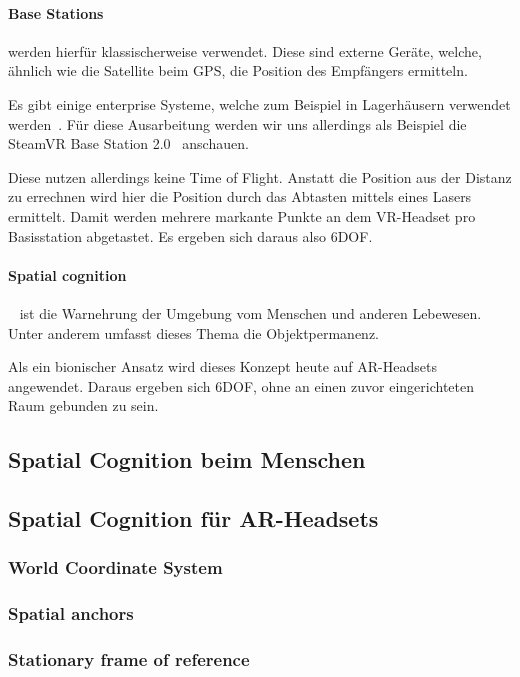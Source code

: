 \paragraph{Base Stations}\label{par:base-stations} werden hierfür klassischerweise verwendet.
Diese sind externe Geräte, welche, ähnlich wie die Satellite beim GPS, die Position des Empfängers ermitteln.

Es gibt einige enterprise Systeme, welche zum Beispiel in Lagerhäusern verwendet werden~\autocite{wikipedia-contributors-2023E}.
Für diese Ausarbeitung werden wir uns allerdings als Beispiel die SteamVR Base Station 2.0~\autocite{valve-corporation-no-date} anschauen.

Diese nutzen allerdings keine Time of Flight.
Anstatt die Position aus der Distanz zu errechnen wird hier die Position durch das Abtasten mittels eines Lasers ermittelt.
Damit werden mehrere markante Punkte an dem VR-Headset pro Basisstation abgetastet.
Es ergeben sich daraus also 6DOF\@.

\paragraph{Spatial cognition}~\autocite{wikipedia-contributors-2023F} ist die Warnehrung der Umgebung vom Menschen und anderen Lebewesen.
Unter anderem umfasst dieses Thema die Objektpermanenz.

Als ein bionischer Ansatz wird dieses Konzept heute auf AR-Headsets angewendet.
Daraus ergeben sich 6DOF, ohne an einen zuvor eingerichteten Raum gebunden zu sein.

\subsection{Spatial Cognition beim Menschen}\label{subsec:spatial-cognition-beim-menschen}


\subsection{Spatial Cognition für AR-Headsets}\label{subsec:spatial-cognition-fuer-ar-headsets}
\subsubsection{World Coordinate System}\label{subsubsec:world-coordinate-system}
\subsubsection{Spatial anchors}\label{subsubsec:spatial-anchors}
\subsubsection{Stationary frame of reference}\label{subsubsec:stationary-frame-of-reference}
